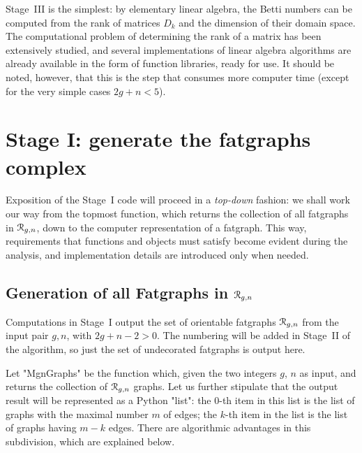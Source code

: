 Stage~III is the simplest: by elementary linear algebra, the Betti
numbers can be computed from the rank of matrices $D_k$ and the
dimension of their domain space.  The computational problem of
determining the rank of a matrix has been extensively studied, and
several implementations of linear algebra algorithms are already
available in the form of function libraries, ready for use. It should
be noted, however, that this is the step that consumes more computer
time (except for the very simple cases $2g+n<5$).

\section[Stage I]{Stage I: generate the fatgraphs complex}
\label{sec:stage-i}

Exposition of the Stage~I code will proceed in a \emph{top-down}
fashion: we shall work our way from the topmost function, which
returns the collection of all fatgraphs in $\mathcal{R}_{g,n}$, down to the
computer representation of a fatgraph.  This way, requirements that
functions and objects must satisfy become evident during the analysis,
and implementation details are introduced only when needed.

\subsection{Generation of all Fatgraphs in $\mathcal{R}_{g,n}$}
\label{sec:stage1-all}

Computations in Stage~I output the set of orientable fatgraphs
$\mathcal{R}_{g,n}$ from the input pair $g, n$, with $2g +n - 2 > 0$.  The
numbering will be added in Stage~II of the algorithm, so just the set
of undecorated fatgraphs is output here.

Let "MgnGraphs" be the function which, given the two integers $g$,
$n$ as input, and returns the collection of $\mathcal{R}_{g,n}$ graphs.  Let us
further stipulate that the output result will be represented as a
Python "list": the $0$-th item in this list is the list of graphs
with the maximal number $m$ of edges; the $k$-th item in the list is
the list of graphs having $m - k$ edges.  There are algorithmic
advantages in this subdivision, which are explained below.

